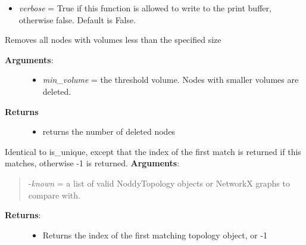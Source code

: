 \documentclass[a4paper,10pt,english]{sphinxmanual}
\begin{document}
\begin{fulllineitems}
\begin{fulllineitems}
\begin{description}
\begin{itemize}
\begin{description}
\end{description}

\item {} 
\emph{verbose} = True if this function is allowed to write to the print buffer, otherwise false. Default is False.

\end{itemize}

\end{description}

\end{fulllineitems}


\begin{fulllineitems}
\label{pynoddy:pynoddy.output.NoddyTopology.filter_node_volumes}
Removes all nodes with volumes less than the specified size
\begin{description}
\item[{\textbf{Arguments}:}] \leavevmode\begin{itemize}
\item {} 
\emph{min\_volume} = the threshold volume. Nodes with smaller volumes are deleted.

\end{itemize}

\item[{\textbf{Returns}}] \leavevmode\begin{itemize}
\item {} 
returns the number of deleted nodes

\end{itemize}

\end{description}

\end{fulllineitems}


\begin{fulllineitems}
\label{pynoddy:pynoddy.output.NoddyTopology.find_first_match}
Identical to is\_unique, except that the index of the first match is returned if this matches, otherwise
-1 is returned.
\textbf{Arguments}:
\begin{quote}

-\emph{known} = a list of valid NoddyTopology objects or NetworkX graphs to compare with.
\end{quote}
\begin{description}
\item[{\textbf{Returns}:}] \leavevmode\begin{itemize}
\item {} 
Returns the index of the first matching topology object, or -1


\end{itemize}
\end{description}
\end{fulllineitems}
\end{fulllineitems}
\end{document}
